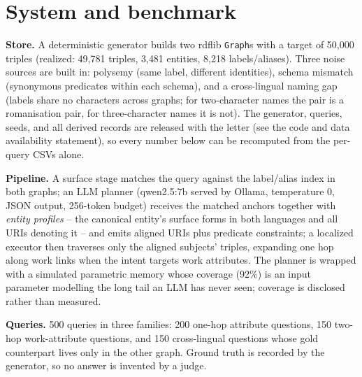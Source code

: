 \documentclass[a4paper,fleqn]{cas-dc}
\begin{document}
\section{System and benchmark}\label{sec:system}
\textbf{Store.} A deterministic generator builds two rdflib \texttt{Graph}s
with a target of 50{,}000 triples (realized: 49{,}781 triples, 3{,}481
entities, 8{,}218 labels/aliases). Three noise sources are built in: polysemy
(same label, different identities), schema mismatch (synonymous predicates
within each schema), and a cross-lingual naming gap (labels share no
characters across graphs; for two-character names the pair is a romanisation
pair, for three-character names it is not). The generator, queries, seeds,
and all derived records are released with the letter (see the code and data
availability statement), so every number below can be recomputed from the
per-query CSVs alone.

\textbf{Pipeline.} A surface stage matches the query against the label/alias
index in both graphs; an LLM planner (qwen2.5:7b served by Ollama, temperature
0, JSON output, 256-token budget) receives the matched anchors together with
\emph{entity profiles} -- the canonical entity's surface forms in both
languages and all URIs denoting it -- and emits aligned URIs plus predicate
constraints; a localized executor then traverses only the aligned subjects'
triples, expanding one hop along work links when the intent targets work
attributes. The planner is wrapped with a simulated parametric memory whose
coverage (92\%) is an input parameter modelling the long tail an LLM has never
seen; coverage is disclosed rather than measured.

\textbf{Queries.} 500 queries in three families: 200 one-hop attribute
questions, 150 two-hop work-attribute questions, and 150 cross-lingual
questions whose gold counterpart lives only in the other graph. Ground truth
is recorded by the generator, so no answer is invented by a judge.
\end{document}
